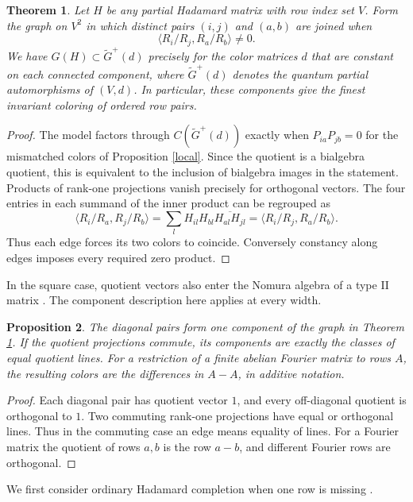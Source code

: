 \documentclass[11pt,a4paper]{article}
\newtheorem{thm}{Theorem}[section]
\newtheorem{prop}[thm]{Proposition}
\begin{document}
\begin{thm}\label{gram}
Let $H$ be any partial Hadamard matrix with row index set $V$. Form the graph on $V^2$ in which distinct pairs $(i,j)$ and $(a,b)$ are joined when
\[
 \langle R_i/R_j,R_a/R_b\rangle\ne0 .
\]
We have $G(H)\subset\widetilde G^+(d)$ precisely for the color matrices $d$ that are constant on each connected component, where $\widetilde G^+(d)$ denotes the quantum partial automorphisms of $(V,d)$. In particular, these components give the finest invariant coloring of ordered row pairs.
\end{thm}
\begin{proof}
The model factors through $C(\widetilde G^+(d))$ exactly when $P_{ia}P_{jb}=0$ for the mismatched colors of Proposition \ref{local}. Since the quotient is a bialgebra quotient, this is equivalent to the inclusion of bialgebra images in the statement. Products of rank-one projections vanish precisely for orthogonal vectors. The four entries in each summand of the inner product can be regrouped as
\[
 \langle R_i/R_a,R_j/R_b\rangle
 =\sum_l H_{il}H_{bl}\overline{H_{al}H_{jl}}
 =\langle R_i/R_j,R_a/R_b\rangle .
\]
Thus each edge forces its two colors to coincide. Conversely constancy along edges imposes every required zero product.
\end{proof}

In the square case, quotient vectors also enter the Nomura algebra of a type II matrix \cite{jmn}. The component description here applies at every width.

\begin{prop}\label{components}
The diagonal pairs form one component of the graph in Theorem \ref{gram}. If the quotient projections commute, its components are exactly the classes of equal quotient lines. For a restriction of a finite abelian Fourier matrix to rows $A$, the resulting colors are the differences in $A-A$, in additive notation.
\end{prop}
\begin{proof}
Each diagonal pair has quotient vector $1$, and every off-diagonal quotient is orthogonal to $1$. Two commuting rank-one projections have equal or orthogonal lines. Thus in the commuting case an edge means equality of lines. For a Fourier matrix the quotient of rows $a,b$ is the row $a-b$, and different Fourier rows are orthogonal.
\end{proof}

We first consider ordinary Hadamard completion when one row is missing \cite{wlfz}.
\end{document}
